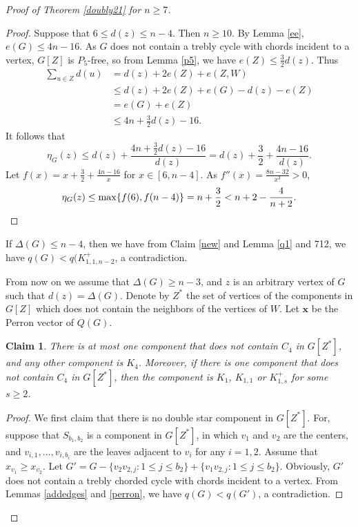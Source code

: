 \documentclass[12pt]{article}
\newtheorem {claim}{Claim}[section]
\begin{document}
\begin{proof}[Proof of Theorem \ref{doubly21} for $n\ge 7$]
\begin{proof}
Suppose that $6\le d(z)\le n-4$. Then $n\ge 10$.
By Lemma \ref{ee}, $e(G)\le 4n-16$.
As $G$ does not contain a trebly cycle with chords incident to a vertex, $G[Z]$ is $P_5$-free, so
from Lemma \ref{p5}, we have $e(Z)\le \frac{3}{2}d(z)$.
Thus
\begin{align*}
\sum_{u\in Z}d(u)&=d(z)+2e(Z)+e(Z,W)\\
&\le d(z)+2e(Z)+e(G)-d(z)-e(Z)\\
&=e(G)+e(Z)\\
&\le 4n+\frac{3}{2}d(z)-16.
\end{align*}
It follows that
\[
\eta_G(z)\le d(z)+\frac{4n+\frac{3}{2}d(z)-16}{d(z)}=d(z)+\frac{3}{2}+\frac{4n-16}{d(z)}.
\]
Let $f(x)=x+\frac{3}{2}+\frac{4n-16}{x}$ for $x\in[6,n-4]$.
As
$f''(x)=\frac{8n-32}{x^3}> 0$,
\[
\eta_G(z)\le \max\{f(6),f(n-4)\}=n+\frac{3}{2}<n+2-\frac{4}{n+2}. \qedhere
\]
\end{proof}

If $\Delta(G)\le n-4$, then we have from Claim \ref{new} and Lemma \ref{q1} and {712}, we have $q(G)<q(K_{1,1,n-2}^+$,   a contradiction.


From now on we assume that $\Delta(G)\ge n-3$, and $z$ is an arbitrary vertex of $G$ such that $d(z)=\Delta(G)$. Denote by $Z^*$ the set of vertices of the components in $G[Z]$ which does not contain the neighbors of the vertices of $W$.
Let $\mathbf{x}$ be the Perron vector of $Q(G)$.

\begin{claim}\label{nok4}
There is at most one component that does not contain $C_4$ in $G[Z^*]$, and any other component
is $K_4$.
Moreover, if there is one component that does not contain $C_4$ in $G[Z^*]$, then the component is $K_1$, $K_{1,1}$ or $K_{1,s}^+$ for some $s\ge 2$.
\end{claim}
\begin{proof}
We first claim that there is no double star component in $G[Z^*]$. For, suppose that  $S_{b_1,b_2}$
is a  component in  $G[Z^*]$, in which  $v_1$ and $v_2$ are the centers, and $v_{i,1},\dots,v_{i,b_i}$ are the leaves adjacent to $v_i$ for any $i=1,2$.
Assume that $x_{v_1}\ge x_{v_2}$.
Let $G'=G-\{v_2v_{2,j}:1\le j\le b_{2}\}+\{v_1v_{2,j}:1\le j\le b_{2}\}$.
Obviously, $G'$ does not contain a trebly chorded cycle with chords incident to a vertex.
From Lemmas \ref{addedges} and \ref{perron}, we have $q(G)<q(G')$, a contradiction.


\end{proof}
\end{proof}
\end{document}
